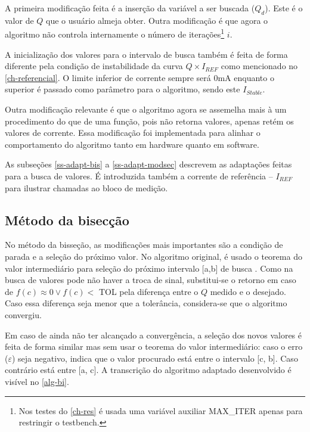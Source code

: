 A primeira modificação feita é a inserção da variável a ser buscada ($Q_d$). Este é o valor de $Q$ que o usuário almeja obter. Outra modificação é que agora o algoritmo não controla internamente o número de iterações\footnote{Nos testes do \autoref{ch-res} é usada uma variável auxiliar MAX\_ITER apenas para restringir o testbench.} $i$.


A inicialização dos valores para o intervalo de busca também é feita de forma diferente pela condição de instabilidade da curva $Q \times I_{REF}$ como mencionado no \autoref{ch-referencial}. O limite inferior de corrente sempre será 0mA enquanto o superior é passado como parâmetro para o algoritmo, sendo este $I_{Stable}$.


Outra modificação relevante é que o algoritmo agora se assemelha mais à um procedimento do que de uma função, pois não retorna valores, apenas retém os valores de corrente. Essa modificação foi implementada para alinhar o comportamento do algoritmo tanto em  hardware quanto em software.

As subseções \autoref{ss-adapt-bis} a \autoref{ss-adapt-modsec} descrevem as adaptações feitas para a busca de valores. É introduzida também a corrente de referência -- $I_{REF}$ para ilustrar chamadas ao bloco de medição.

\subsection{Método da bisecção}\label{ss-adapt-bis}

No método da bisseção, as modificações mais importantes são a condição de parada e a seleção do próximo valor. No algoritmo original, é usado  o  teorema do valor intermediário para seleção do próximo intervalo [a,b] de busca \cite{numerical-anal-burden}. Como na busca de valores pode não haver a troca de sinal, substitui-se o retorno em caso de $f(c) \approx 0 \vee f(c) < $ TOL pela diferença entre o $Q$ medido e o desejado. Caso essa diferença seja menor que a tolerância, considera-se que o algoritmo convergiu.

Em caso de ainda não ter alcançado a convergência, a seleção dos novos valores é feita de forma similar mas sem usar o teorema do valor intermediário: caso o erro ($\varepsilon$) seja negativo, indica que o valor procurado está entre o intervalo [c, b]. Caso contrário está entre [a, c]. A transcrição do algoritmo adaptado desenvolvido é visível no \autoref{alg-bi}.

